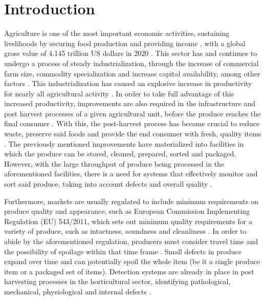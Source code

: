 \documentclass[conference]{IEEEtran}
\begin{document}
\begin{IEEEkeywords}
\end{IEEEkeywords}

\section{Introduction}

Agriculture is one of the most important economic activities, sustaining livelihoods by securing food production and providing income \cite{FDES-1}, with a global gross value of 4.145 trillion US dollars in 2020 \cite{FAO1}. This sector has and continues to undergo a process of steady industrialization, through the increase of commercial farm size, commodity specialization and increase capital availability, among other factors \cite{10.2307/1243439}. This industrialization has caused an explosive increase in productivity for nearly all agricultural activity \cite{owidagriculturalproduction}. In order to take full advantage of this increased productivity, improvements are also required in the infrastructure and post harvest processes of a given agricultural unit, before the produce reaches the final consumer \cite{Food_and_Agriculture_Organization_of_the_United_Nations2010-hb}. With this, the post-harvest process has become crucial to reduce waste, preserve said foods and provide the end consumer with fresh, quality items \cite{foods6010008}. The previously mentioned improvements have materialized into facilities in which the produce can be stored, cleaned, prepared, sorted and packaged. However, with the large throughput of produce being processed in the aforementioned facilities, there is a need for systems that effectively monitor and sort said produce, taking into account defects and overall quality \cite{Mahalik2009}.

Furthermore, markets are usually regulated to include minimum requirements on produce quality and appearance, such as European Commission Implementing Regulation (EU) 543/2011, which sets out minimum quality requirements for a variety of produce, such as intactness, soundness and cleanliness \cite{eu-5432011}. In order to abide by the aforementioned regulation, producers must consider travel time and the possibility of spoilage within that time frame \cite{biv081}. Small defects in produce expand over time and can potentially spoil the whole item (be it a single produce item or a packaged set of items). Detection systems are already in place in post harvesting processes in the horticultural sector, identifying pathological, mechanical, physiological and internal defects \cite{Nturambirwe2020}.
\end{document}
